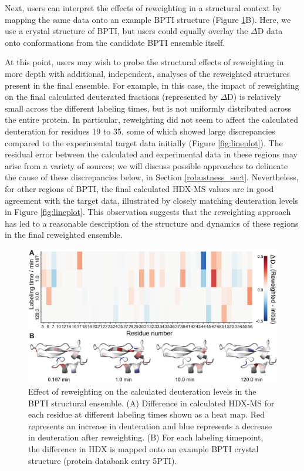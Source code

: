 \documentclass[9pt,tutorial,ASAPversion]{livecoms}
\begin{document}
Next, users can interpret the effects of reweighting in a structural context by mapping the same data onto an example BPTI structure (Figure \ref{fig:heatmap}B).
Here, we use a crystal structure of BPTI, but users could equally overlay the $\Delta$D data onto conformations from the candidate BPTI ensemble itself.

At this point, users may wish to probe the structural effects of reweighting in more depth with additional, independent, analyses of the reweighted structures present in the final ensemble. 
For example, in this case, the impact of reweighting on the final calculated deuterated fractions (represented by $\Delta$D) is relatively small across the different labeling times, but is not uniformly distributed across the entire protein. 
In particular, reweighting did not seem to affect the calculated deuteration for residues 19 to 35, some of which showed large discrepancies compared to the experimental target data initially (Figure \ref{fig:lineplot}). 
The residual error between the calculated and experimental data in these regions may arise from a variety of sources; we will discuss possible approaches to delineate the cause of these discrepancies below, in Section \ref{robustness_sect}.
Nevertheless, for other regions of BPTI, the final calculated HDX-MS values are in good agreement with the target data, illustrated by closely matching deuteration levels in Figure \ref{fig:lineplot}.
This observation suggests that the reweighting approach has led to a reasonable description of the structure and dynamics of these regions in the final reweighted ensemble.

\begin{figure}[t]
    \centering
    \includegraphics[width=0.9\linewidth]{Fig6_heatmap+structures_2col_v2.png}
    \caption{Effect of reweighting on the calculated deuteration levels in the BPTI structural ensemble. (A) Difference in calculated HDX-MS for each residue at different labeling times shown as a heat map. Red represents an increase in deuteration and blue represents a decrease in deuteration after reweighting. (B) For each labeling timepoint, the difference in HDX is mapped onto an example BPTI crystal structure (protein databank entry 5PTI).}
    \label{fig:heatmap}
\end{figure}
\end{document}
